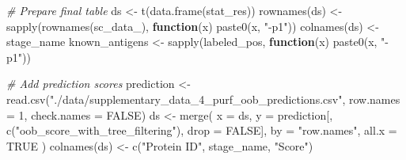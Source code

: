 \documentclass[
  11pt,
  oneside]{book}
\newenvironment{Shaded}{\begin{snugshade}}{\end{snugshade}}
\newcommand{\AttributeTok}[1]{\textcolor[rgb]{0.77,0.63,0.00}{#1}}
\newcommand{\CommentTok}[1]{\textcolor[rgb]{0.56,0.35,0.01}{\textit{#1}}}
\newcommand{\ConstantTok}[1]{\textcolor[rgb]{0.00,0.00,0.00}{#1}}
\newcommand{\ControlFlowTok}[1]{\textcolor[rgb]{0.13,0.29,0.53}{\textbf{#1}}}
\newcommand{\DecValTok}[1]{\textcolor[rgb]{0.00,0.00,0.81}{#1}}
\newcommand{\FunctionTok}[1]{\textcolor[rgb]{0.00,0.00,0.00}{#1}}
\newcommand{\NormalTok}[1]{#1}
\newcommand{\OtherTok}[1]{\textcolor[rgb]{0.56,0.35,0.01}{#1}}
\newcommand{\StringTok}[1]{\textcolor[rgb]{0.31,0.60,0.02}{#1}}
\begin{document}
\begin{Shaded}
\begin{Highlighting}[]
\CommentTok{\# Prepare final table}
\NormalTok{ds }\OtherTok{\textless{}{-}} \FunctionTok{t}\NormalTok{(}\FunctionTok{data.frame}\NormalTok{(stat\_res))}
\FunctionTok{rownames}\NormalTok{(ds) }\OtherTok{\textless{}{-}} \FunctionTok{sapply}\NormalTok{(}\FunctionTok{rownames}\NormalTok{(sc\_data\_), }\ControlFlowTok{function}\NormalTok{(x) }\FunctionTok{paste0}\NormalTok{(x, }\StringTok{"{-}p1"}\NormalTok{))}
\FunctionTok{colnames}\NormalTok{(ds) }\OtherTok{\textless{}{-}}\NormalTok{ stage\_name}
\NormalTok{known\_antigens }\OtherTok{\textless{}{-}} \FunctionTok{sapply}\NormalTok{(labeled\_pos, }\ControlFlowTok{function}\NormalTok{(x) }\FunctionTok{paste0}\NormalTok{(x, }\StringTok{"{-}p1"}\NormalTok{))}

\CommentTok{\# Add prediction scores}
\NormalTok{prediction }\OtherTok{\textless{}{-}} \FunctionTok{read.csv}\NormalTok{(}\StringTok{"./data/supplementary\_data\_4\_purf\_oob\_predictions.csv"}\NormalTok{, }\AttributeTok{row.names =} \DecValTok{1}\NormalTok{, }\AttributeTok{check.names =} \ConstantTok{FALSE}\NormalTok{)}
\NormalTok{ds }\OtherTok{\textless{}{-}} \FunctionTok{merge}\NormalTok{(}
  \AttributeTok{x =}\NormalTok{ ds, }\AttributeTok{y =}\NormalTok{ prediction[, }\FunctionTok{c}\NormalTok{(}\StringTok{"oob\_score\_with\_tree\_filtering"}\NormalTok{), }\AttributeTok{drop =} \ConstantTok{FALSE}\NormalTok{],}
  \AttributeTok{by =} \StringTok{"row.names"}\NormalTok{, }\AttributeTok{all.x =} \ConstantTok{TRUE}
\NormalTok{)}
\FunctionTok{colnames}\NormalTok{(ds) }\OtherTok{\textless{}{-}} \FunctionTok{c}\NormalTok{(}\StringTok{"Protein ID"}\NormalTok{, stage\_name, }\StringTok{"Score"}\NormalTok{)}


\end{Highlighting}
\end{Shaded}
\end{document}
